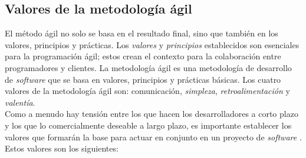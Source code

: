 \documentclass[12pt]{article}
\begin{document}
\vspace{1cm}
\subsection{ Valores de la metodología ágil }

El método ágil no solo se basa en el resultado final, sino que también en los
valores, principios y prácticas. Los {\it valores} y {\it principios} establecidos
son esenciales para la programación ágil; estos crean el contexto para la
colaboración entre programadores y clientes. La metodología ágil es una metodología de desarrollo de \textit{software} que se basa en valores, principios y prácticas básicas. Los cuatro valores de la metodología ágil son: {comunicación}, \textit{simpleza}, \textit{retroalimentación} y \textit{valentía}.\\

Como a menudo hay tensión entre los que hacen los desarrolladores a corto plazo
y los que lo comercialmente deseable a largo plazo, es importante establecer los valores que formarán la base para actuar en conjunto en un proyecto de {\it software }. Estos valores son los siguientes:
\end{document}
